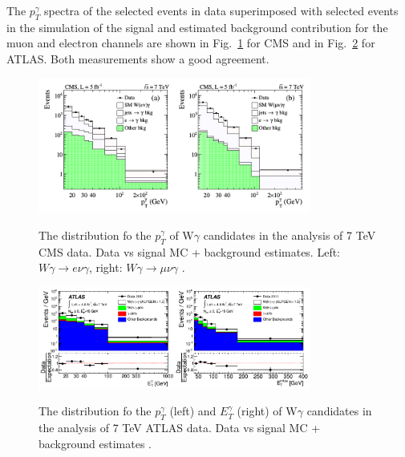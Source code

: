 The $p_T^\gamma$ spectra of the selected events in data superimposed with selected events in the simulation of the signal and estimated background contribution for the muon and electron channels are shown in Fig.~\ref{fig:Wg7TeV_CMS_ptGamma} for CMS and in Fig.~\ref{fig:Wg7TeV_ATLAS_ptGamma} for ATLAS. Both measurements show a good agreement.\\

\begin{figure}[htb]
  \begin{center}
    {\includegraphics[width=0.80\textwidth]{../figs/WgAbout/Wg7TeV_CMS_ptGamma.png}}
    \caption{The distribution fo the $p_T^\gamma$ of W$\gamma$ candidates in the analysis of 7 TeV CMS data. Data vs signal MC + background estimates. Left: $W\gamma\rightarrow e\nu\gamma$, right: $W\gamma\rightarrow \mu\nu\gamma$ \cite{ref_7TeV_CMS}.}
    \label{fig:Wg7TeV_CMS_ptGamma}
  \end{center}
\end{figure}

\begin{figure}[htb]
  \begin{center}
    {\includegraphics[width=0.80\textwidth]{../figs/WgAbout/Wg7TeV_ATLAS_ptGamma.png}}
    \caption{The distribution fo the $p_T^\gamma$ (left) and $E_T^\gamma$ (right) of W$\gamma$ candidates in the analysis of 7 TeV ATLAS data. Data vs signal MC + background estimates \cite{ref_7TeV_ATLAS}. }
    \label{fig:Wg7TeV_ATLAS_ptGamma}
  \end{center}
\end{figure}

